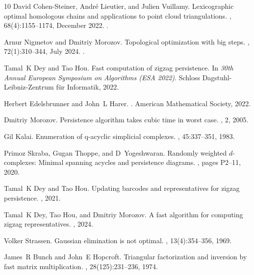 \documentclass[10pt,a4paper]{article}
\begin{document}
\begin{thebibliography}{10}
David Cohen-Steiner, André Lieutier, and Julien Vuillamy.
\newblock Lexicographic optimal homologous chains and applications to point cloud triangulations.
, 68(4):1155--1174, December 2022.
\newblock \href {https://doi.org/10.1007/s00454-022-00432-6} {}.

Arnur Nigmetov and Dmitriy Morozov.
\newblock Topological optimization with big steps.
, 72(1):310--344, July 2024.
\newblock \href {https://doi.org/10.1007/s00454-023-00613-x} {}.

Tamal~K Dey and Tao Hou.
\newblock Fast computation of zigzag persistence.
\newblock In {\em 30th Annual European Symposium on Algorithms (ESA 2022)}. Schloss Dagstuhl-Leibniz-Zentrum f{\"u}r Informatik, 2022.

Herbert Edelsbrunner and John~L Harer.
.
\newblock American Mathematical Society, 2022.

Dmitriy Morozov.
\newblock Persistence algorithm takes cubic time in worst case.
, 2, 2005.

Gil Kalai.
\newblock Enumeration of q-acyclic simplicial complexes.
, 45:337--351, 1983.

Primoz Skraba, Gugan Thoppe, and D~Yogeshwaran.
\newblock Randomly weighted $ d $-complexes: Minimal spanning acycles and persistence diagrams.
, pages P2--11, 2020.

Tamal~K Dey and Tao Hou.
\newblock Updating barcodes and representatives for zigzag persistence.
, 2021.

Tamal~K Dey, Tao Hou, and Dmitriy Morozov.
\newblock A fast algorithm for computing zigzag representatives.
, 2024.

Volker Strassen.
\newblock Gaussian elimination is not optimal.
, 13(4):354--356, 1969.

James~R Bunch and John~E Hopcroft.
\newblock Triangular factorization and inversion by fast matrix multiplication.
, 28(125):231--236, 1974.

\end{thebibliography}
\end{document}
